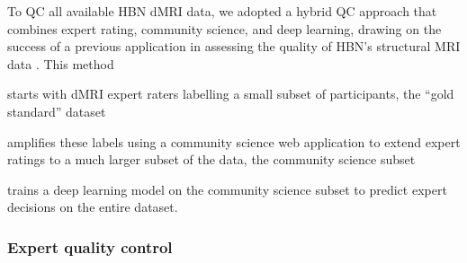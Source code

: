 \documentclass[9pt,lineno]{elife}
\begin{document}
To QC all available HBN dMRI data, we adopted a hybrid QC approach that
combines expert rating, community science, and deep learning, drawing on the
success of a previous application in assessing the quality of HBN's structural
MRI data \citep{keshavan2019-er}. This method
\begin{enumerate*}[%
    label=(\roman*),%
    before={{ }},%
    itemjoin={{; }},%
    itemjoin*={{ and }}]
    \item starts with dMRI expert raters labelling a small subset of participants,
    the ``gold standard'' dataset
    \item amplifies these labels using a community science web application to
    extend expert ratings to a much larger subset of the data, the community
    science subset
    \item trains a deep learning model on the community science subset to
    predict expert decisions on the entire dataset.
\end{enumerate*}

\subsubsection{Expert quality control}
\end{document}
